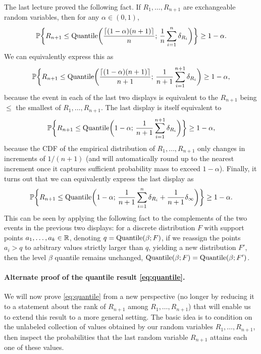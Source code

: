 \documentclass{article}
\begin{document}
The last lecture proved the following fact. If $R_1,\dots,R_{n+1}$ are
exchangeable random variables, then for any $\alpha \in (0,1)$, 
\[
\mathbb{P}\bigg\{ R_{n+1} \leq \mathrm{Quantile}\bigg( \frac{\lceil (1-\alpha)(n+1) \rceil}{n};
\, \frac{1}{n} \sum_{i=1}^n \delta_{R_i} \bigg) \bigg\} \geq 1-\alpha.
\]
We can equivalently express this as
\[
\mathbb{P}\bigg\{ R_{n+1} \leq \mathrm{Quantile}\bigg( \frac{\lceil (1-\alpha)(n+1) \rceil}{n+1}; 
\, \frac{1}{n+1} \sum_{i=1}^{n+1} \delta_{R_i} \bigg) \geq 1-\alpha,
\]
because the event in each of the last two displays is equivalent to the
$R_{n+1}$ being $\leq$ the  
smallest of $R_1,\dots,R_{n+1}$. The last display is itself equivalent to
\[
\mathbb{P}\bigg\{ R_{n+1} \leq \mathrm{Quantile}\bigg( 1-\alpha; \, \frac{1}{n+1}
\sum_{i=1}^{n+1} \delta_{R_i} \bigg) \bigg\} \geq 1-\alpha, 
\]
because the CDF of the empirical distribution of $R_1,\dots,R_{n+1}$ only
changes in increments of $1/(n+1)$ (and will automatically round up to the
nearest increment once it captures sufficient probability mass to exceed
$1-\alpha$). Finally, it turns out that we can equivalently express the last
display as    
\begin{equation}
\label{eq:quantile}
\mathbb{P}\bigg\{ R_{n+1} \leq \mathrm{Quantile}\bigg( 1-\alpha; \, \frac{1}{n+1} \sum_{i=1}^n
\delta_{R_i} + \frac{1}{n+1} \delta_\infty \bigg) \bigg\} \geq 1-\alpha.
\end{equation}
This can be seen by applying the following fact to the complements of the two
events in the previous two displays: for a discrete distribution $F$ with
support points $a_1,\dots,a_k \in \mathbb{R}$, denoting $q=\mathrm{Quantile}(\beta; F)$, if we
reassign the points $a_i > q$ to arbitrary values strictly larger than $q$,
yielding a new distribution $F'$, then the level $\beta$ quantile remains
unchanged, $\mathrm{Quantile}(\beta; F) = \mathrm{Quantile}(\beta; F')$.  

\paragraph{Alternate proof of the quantile result \eqref{eq:quantile}.}

We will now prove \eqref{eq:quantile} from a new perspective (no longer by
reducing it to a statement about the rank of $R_{n+1}$ among
$R_1,\dots,R_{n+1}$) that will enable us to extend this result to a more general
setting. The basic idea is to condition on the unlabeled collection of values
obtained by our random variables $R_1,\dots,R_{n+1}$, then inspect the
probabilities that the last random variable $R_{n+1}$ attains each one of these
values.  
\end{document}
